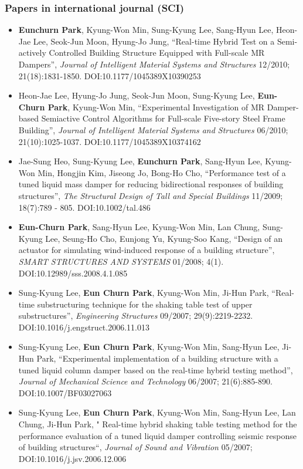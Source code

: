\subsubsection*{Papers in international journal (SCI)}
\begin{itemize}
\item[]
  \textbf{Eunchurn Park}, Kyung-Won Min, Sung-Kyung Lee, Sang-Hyun Lee,
  Heon-Jae Lee, Seok-Jun Moon, Hyung-Jo Jung, ``Real-time Hybrid Test on
  a Semi-actively Controlled Building Structure Equipped with Full-scale
  MR Dampers'', \emph{Journal of Intelligent Material Systems and
  Structures} 12/2010; 21(18):1831-1850. DOI:10.1177/1045389X10390253
\item[]
  Heon-Jae Lee, Hyung-Jo Jung, Seok-Jun Moon, Sung-Kyung Lee,
  \textbf{Eun-Churn Park}, Kyung-Won Min, ``Experimental Investigation
  of MR Damper-based Semiactive Control Algorithms for Full-scale
  Five-story Steel Frame Building'', \emph{Journal of Intelligent
  Material Systems and Structures} 06/2010; 21(10):1025-1037.
  DOI:10.1177/1045389X10374162 
\item[]
  Jae-Sung Heo, Sung-Kyung Lee, \textbf{Eunchurn Park}, Sang-Hyun Lee,
  Kyung-Won Min, Hongjin Kim, Jiseong Jo, Bong-Ho Cho, ``Performance
  test of a tuned liquid mass damper for reducing bidirectional
  responses of building structures'', \emph{The Structural Design of
  Tall and Special Buildings} 11/2009; 18(7):789 - 805.
  DOI:10.1002/tal.486
\item[]
  \textbf{Eun-Churn Park}, Sang-Hyun Lee, Kyung-Won Min, Lan Chung,
  Sung-Kyung Lee, Seung-Ho Cho, Eunjong Yu, Kyung-Soo Kang, ``Design of
  an actuator for simulating wind-induced response of a building
  structure'', \emph{SMART STRUCTURES AND SYSTEMS} 01/2008; 4(1).
  DOI:10.12989/sss.2008.4.1.085
\item[]
  Sung-Kyung Lee, \textbf{Eun Churn Park}, Kyung-Won Min, Ji-Hun Park,
  ``Real-time substructuring technique for the shaking table test of
  upper substructures'', \emph{Engineering Structures} 09/2007;
  29(9):2219-2232. DOI:10.1016/j.engstruct.2006.11.013
\item[]
  Sung-Kyung Lee, \textbf{Eun Churn Park}, Kyung-Won Min, Sang-Hyun Lee,
  Ji-Hun Park, ``Experimental implementation of a building structure
  with a tuned liquid column damper based on the real-time hybrid
  testing method'', \emph{Journal of Mechanical Science and Technology}
  06/2007; 21(6):885-890. DOI:10.1007/BF03027063 
\item[]
  Sung-Kyung Lee, \textbf{Eun Churn Park}, Kyung-Won Min, Sang-Hyun Lee,
  Lan Chung, Ji-Hun Park, " Real-time hybrid shaking table testing
  method for the performance evaluation of a tuned liquid damper
  controlling seismic response of building structures``, \emph{Journal
  of Sound and Vibration} 05/2007; DOI:10.1016/j.jsv.2006.12.006
\end{itemize}

